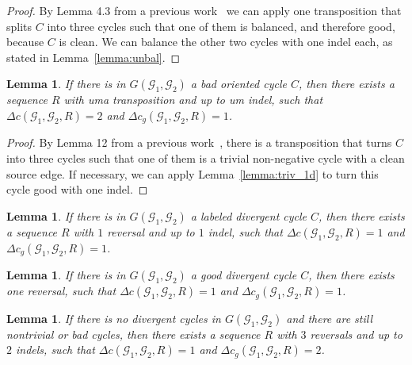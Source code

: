 \documentclass[12pt]{article}
\newtheorem{lemma}[theorem]{Lemma}
\begin{document}
\begin{proof}
By Lemma 4.3 from a previous work~\cite{2021a-oliveira-etal} we can apply one transposition that splits $C$ into three cycles such that one of them is balanced, and therefore good, because $C$ is clean. We can balance the other two cycles with one indel each, as stated in Lemma~\ref{lemma:unbal}.
\end{proof}

\vspace{8pt}
\begin{lemma}\label{lemma:bad_ori_1t_1d}
If there is in $G(\mathcal{G}_1,\mathcal{G}_2)$ a bad oriented cycle $C$, then there exists a sequence $R$ with uma transposition and up to um indel, such that $\Delta c(\mathcal{G}_1,\mathcal{G}_2,R) = 2$ and $\Delta c_g(\mathcal{G}_1,\mathcal{G}_2,R) = 1$.
\end{lemma}

\begin{proof}
By Lemma 12 from a previous work~\cite{2023b-alexandrino-etal}, there is a transposition that turns $C$ into three cycles such that one of them is a trivial non-negative cycle with a clean source edge. If necessary, we can apply Lemma~\ref{lemma:triv_1d} to turn this cycle good with one indel.
\end{proof}

\vspace{8pt}
\begin{lemma}\cite[Lemma 7]{2021b-alexandrino-etal}\label{lemma:bad_div_1r_1d}
If there is in $G(\mathcal{G}_1,\mathcal{G}_2)$ a labeled divergent cycle $C$, then there exists a sequence $R$ with $1$ reversal and up to $1$ indel, such that $\Delta c(\mathcal{G}_1,\mathcal{G}_2,R) = 1$ and $\Delta c_g(\mathcal{G}_1,\mathcal{G}_2,R) = 1$.
\end{lemma}

\vspace{8pt}
\begin{lemma}\cite[Lemma 8]{2021b-alexandrino-etal}\label{lemma:good_div_1r}
If there is in $G(\mathcal{G}_1,\mathcal{G}_2)$ a good divergent cycle $C$, then there exists one reversal, such that $\Delta c(\mathcal{G}_1,\mathcal{G}_2,R) = 1$ and $\Delta c_g(\mathcal{G}_1,\mathcal{G}_2,R) = 1$.
\end{lemma}

\vspace{8pt}
\begin{lemma}\label{lemma:bad_nodiv_3r_2d}
If there is no divergent cycles in $G(\mathcal{G}_1,\mathcal{G}_2)$ and there are still nontrivial or bad cycles, then there exists a sequence $R$ with $3$ reversals and up to $2$ indels, such that $\Delta c(\mathcal{G}_1,\mathcal{G}_2,R) = 1$ and $\Delta c_g(\mathcal{G}_1,\mathcal{G}_2,R) = 2$.
\end{lemma}
\end{document}
